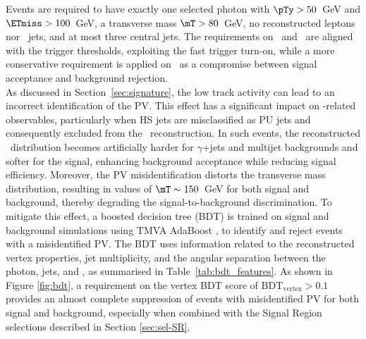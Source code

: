 Events are required to have exactly one selected photon with $\pTy > 50$~GeV and $\ETmiss > 100$~GeV, a transverse mass $\mT > 80$~GeV, no reconstructed leptons nor \btagged\ jets, and at most three central jets. %
The requirements on \pTy\ and \mT\ are aligned with the trigger thresholds, exploiting the fast trigger turn-on, while a more conservative requirement is applied on \ETmiss\  as a compromise between signal acceptance and background rejection.
\\
As discussed in Section~\ref{sec:signature}, the low track activity can lead to an incorrect identification of the PV. This effect has a significant impact on \ETmiss-related observables, particularly when HS jets are misclassified as PU jets and consequently excluded from the \ETmiss\ reconstruction. In such events, the reconstructed \ETmiss\ distribution becomes artificially harder for $\gamma$+jets and multijet backgrounds and softer for the signal, enhancing background acceptance while reducing signal efficiency. Moreover, the PV misidentification distorts the transverse mass distribution, resulting in values of $\mT \sim 150$~GeV for both signal and background, thereby degrading the signal-to-background discrimination.
To mitigate this effect, a boosted decision tree (BDT) is trained on signal and background simulations using TMVA AdaBoost \cite{FREUND1997119}, to identify and reject events with a misidentified PV. The BDT uses information related to the reconstructed vertex properties, jet multiplicity, and the angular separation between the photon, jets, and \ETmiss, as summarised in Table~\ref{tab:bdt_features}. %
As shown in Figure \ref{fig:bdt}, a requirement on the vertex BDT score of $\mathrm{BDT}_{\mathrm{vertex}}>0.1$ provides an almost complete suppression of events with misidentified PV for both signal and background, especially when combined with the Signal Region selections described in Section \ref{sec:sel-SR}.\\


